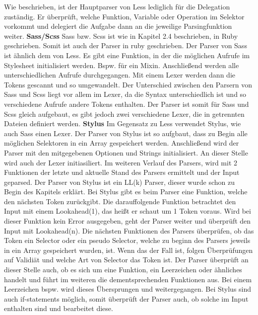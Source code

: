 Wie beschrieben, ist der Hauptparser von Less lediglich für die Delegation zuständig. Er überprüft, welche Funktion, Variable oder Operation im Selektor vorkommt und delegiert die Aufgabe dann an die jeweilige Parsingfunktion weiter.
\newline\newline
\textbf{Sass/Scss}\newline
Sass bzw. Scss ist wie in Kapitel 2.4 beschrieben, in Ruby geschrieben. Somit ist auch der Parser in ruby geschrieben.\newline
Der Parser von Sass ist ähnlich dem von Less. Es gibt eine Funktion, in der die möglichen Aufrufe im Stylesheet initialisiert werden. Bspw. für ein Mixin. Anschließend werden alle unterschiedlichen Aufrufe durchgegangen. Mit einem Lexer werden dann die Tokens gescannt und so umgewandelt.
Der Unterschied zwischen den Parsern von Sass und Scss liegt vor allem im Lexer, da die Syntax unterschiedlich ist und so verschiedene Aufrufe andere Tokens enthalten. \newline
Der Parser ist somit für Sass und Scss gleich aufgebaut, es gibt jedoch zwei verschiedene Lexer, die in getrennten Dateien definiert werden.
\newline\newline
\textbf{Stylus}\newline
Im Gegensatz zu Less verwendet Stylus, wie auch Sass einen Lexer. Der Parser von Stylus ist so aufgbaut, dass zu Begin alle möglichen Selektoren in ein Array gespeichert werden. Anschließend wird der Parser mit den mitgegebenen Optionen und Strings initialisiert. An dieser Stelle wird auch der Lexer initiasiliert.\newline
Im weiteren Verlauf des Parsers, wird mit 2 Funktionen der letzte und aktuelle Stand des Parsers ermittelt und der Input geparsed.\newline
Der Parser von Stylus ist ein LL(k) Parser, dieser wurde schon zu Begin des Kapitels erklärt. Bei Stylus gibt es beim Parser eine Funktion, welche den nächsten Token zurückgibt. Die darauffolgende Funktion betrachtet den Input mit einem Lookahead(1), das heißt er schaut um 1 Token voraus. Wird bei dieser Funktion kein Error ausgegeben, geht der Parser weiter und überprüft den Input mit Lookahead(n). \newline
Die nächsten Funktionen des Parsers überprüfen, ob das Token ein Selector oder ein pseudo Selector, welche zu beginn des Parsers jeweils in ein Array gespeichert wurden, ist. Wenn das der Fall ist, folgen Überprüfungen auf Validiät und welche Art von Selector das Token ist. Der Parser überprüft an dieser Stelle auch, ob es sich um eine Funktion, ein Leerzeichen oder ähnliches handelt und führt im weiteren die dementsprechenden Funktionen aus. Bei einem Leerzeichen bspw. wird dieses Übersprungen und weitergegangen.\newline
Bei Stylus sind auch if-statements möglich, somit überprüft der Parser auch, ob solche im Input enthalten sind und bearbeitet diese.
\newpage


